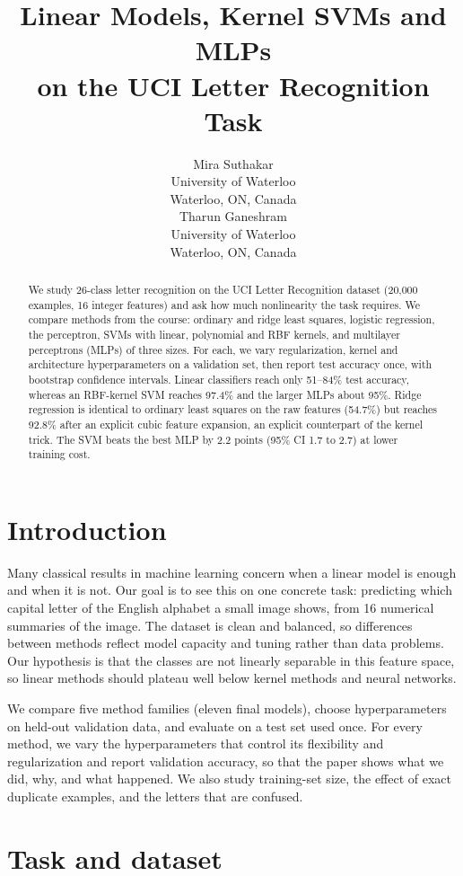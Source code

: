 \documentclass{article}
\title{Linear Models, Kernel SVMs and MLPs\\ on the UCI Letter Recognition Task}
\author{%
  Mira Suthakar \\
  University of Waterloo \\
  Waterloo, ON, Canada \\
  \And
  Tharun Ganeshram \\
  University of Waterloo \\
  Waterloo, ON, Canada \\
}
\begin{document}
\maketitle

\begin{abstract}
We study 26-class letter recognition on the UCI Letter Recognition dataset (20,000 examples, 16 integer features) and ask how much nonlinearity the task requires. We compare methods from the course: ordinary and ridge least squares, logistic regression, the perceptron, SVMs with linear, polynomial and RBF kernels, and multilayer perceptrons (MLPs) of three sizes. For each, we vary regularization, kernel and architecture hyperparameters on a validation set, then report test accuracy once, with bootstrap confidence intervals. Linear classifiers reach only 51--84\% test accuracy, whereas an RBF-kernel SVM reaches 97.4\% and the larger MLPs about 95\%. Ridge regression is identical to ordinary least squares on the raw features (54.7\%) but reaches 92.8\% after an explicit cubic feature expansion, an explicit counterpart of the kernel trick. The SVM beats the best MLP by 2.2 points (95\% CI 1.7 to 2.7) at lower training cost.
\end{abstract}

\section{Introduction}
Many classical results in machine learning concern when a linear model is enough and when it is not. Our goal is to see this on one concrete task: predicting which capital letter of the English alphabet a small image shows, from 16 numerical summaries of the image. The dataset is clean and balanced, so differences between methods reflect model capacity and tuning rather than data problems. Our hypothesis is that the classes are not linearly separable in this feature space, so linear methods should plateau well below kernel methods and neural networks.

We compare five method families (eleven final models), choose hyperparameters on held-out validation data, and evaluate on a test set used once. For every method, we vary the hyperparameters that control its flexibility and regularization and report validation accuracy, so that the paper shows what we did, why, and what happened. We also study training-set size, the effect of exact duplicate examples, and the letters that are confused.

\section{Task and dataset}
\end{document}
